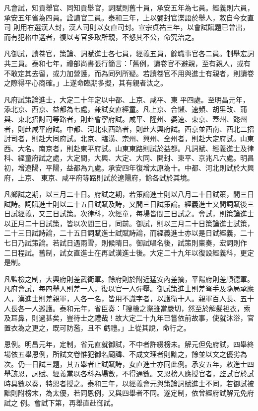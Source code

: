 \begin{pinyinscope}
 凡會試，知貢舉官、同知貢舉官，詞賦則舊十員，承安五年為七員。經義則六員，承安五年省為四員。詮讀官二員。泰和三年，上以彌封官渫語於舉人，敕自今女直司
 則用右選漢人封，漢人司則以女直司封。宣宗貞祐三年，以會試賦題已曾出，而有犯格中選者，復以考官多取所親，不怒其不公，命究治之。



 凡御試，讀卷官，策論、詞賦進士各七員，經義五員，餘職事官各二員。制舉宏詞共三員。泰和七年，禮部尚書張行簡言：「舊例，讀卷官不避親，至有親人，或有不敢定其去留，或力加營護，而為同列所疑。若讀卷官不用與進士有親者，則讀卷之際得平心商確。」上遂命臨期多擬，其有親者汰之。



 凡府試策論進士，大定二十年定以中都、上京、咸平、東
 平四處。至明昌元年，添北京、西京、益都為七處，兼試女直經童。凡上京、合懶、速頻、胡里改、蒲與、東北招討司等路者，則赴會寧府試。咸平、隆州、婆速、東京、蓋州、懿州者，則赴咸平府試。中都、河北東西路者，則赴大興府試。西京並西南、西北二招討司者，則赴大同府試。北京、臨潢、宗州、興州、全州者，則赴大定府試。山東西、大名、南京者，則赴東平府試。山東東路則試於益都。凡詞賦、經義進士及律科、經童府試之處，大定間，大興、大定、大同、開封、東平、京兆凡六處。明昌初，增遼陽，平陽，益都為九處。承安四年復增太原為十。中都、河北則試於大興府，上京、
 東京、咸平府等路則試於遼陽府，餘各試於其境。



 凡鄉試之期，以三月二十日。府試之期，若策論進士則以八月二十日試策，間三日試詩。詞賦進士則以二十五日試賦及詩，又間三日試策論。經義進士又間詞賦後三日試經義，又三日試策。次律科，次經童，每場皆間三日試之。會試，則策論進士以正月二十日試策，皆以次間三日，同前。御試，則以三月二十日策論進士試策，二十三日試詩論，二十五日詞賦進士試賦詩論，而經義進士亦以是日試經義，二十七日乃試策論。若試日遇雨雪，則候晴日。御試唱名後，試策則稟奏，宏詞則作
 二日程試。舊制，試女直進士在再試漢進士後。大定二十九年以復設經義科，更定是制。



 凡監檢之制，大興府則差武衛軍。餘府則於附近猛安內差摘，平陽府則差順德軍。凡府會試，每四舉人則差一人，復以官一人彈壓。御試策進士則差弩手及隨局承應人，漢進士則差親軍，人各一名，皆用不識字者，以護衛十人。親軍百人長、五十人長各一人巡護。泰和元年，省臣奏：「搜檢之際雖當嚴切，然至於解髮袒衣，索及耳鼻，則過甚矣，豈待士之禮哉！故大定二十九年已嘗依前故事，使就沐浴，官置衣為之更之，既可防濫，且不
 虧禮。」上從其說，命行之。



 恩例。明昌元年，定制，省元直就御試，不中者許綴榜未。解元但免府試，四舉終場依五舉恩例，所試文卷惟犯御名廟諱、不成文理者則黜之，餘並以文之優劣為次。仍一日試三題，其五舉者止試賦詩，女直進士亦同此例。承安五年，敕進士四舉該恩，詞賦、經義當以各科為場數，不得通數。又恩榜人應授官者，監試官於試時具數以奏，特恩者授之。泰和三年，以經義會元與策論詞賦進士不同，若御試被黜則附榜末，為太優，若同恩例，又與四舉者不同。遂定制，依曾經府試解元免府試之
 例。會試下第，再舉直赴御試。




\end{pinyinscope}
